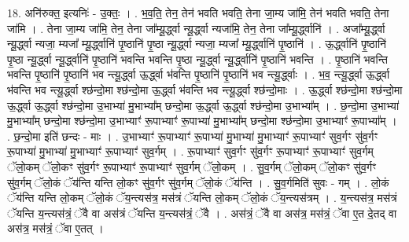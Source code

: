 \documentclass[17pt]{extarticle}
\begin{document}
18. अनि॑रुक्त॒ इत्यनिः॑ - उ॒क्तः॒ । . भ॒व॒ति॒ तेन॒ तेन॑ भवति भवति॒ तेना जा॒म्य जा॑मि॒ तेन॑ भवति भवति॒ तेना जा॑मि । . तेना जा॒म्य जा॑मि॒ तेन॒ तेना जा᳚म्यू॒र्द्ध्वा न्यू॒र्द्ध्वा न्यजा॑मि॒ तेन॒ तेना जा᳚म्यू॒र्द्ध्वानि॑ । . अजा᳚म्यू॒र्द्ध्वा न्यू॒र्द्ध्वा न्यजा॒ म्यजा᳚ म्यू॒र्द्ध्वानि॑ पृ॒ष्ठानि॑ पृ॒ष्ठा न्यू॒र्द्ध्वा न्यजा॒ म्यजा᳚ म्यू॒र्द्ध्वानि॑ पृ॒ष्ठानि॑ । . ऊ॒र्द्ध्वानि॑ पृ॒ष्ठानि॑ पृ॒ष्ठा न्यू॒र्द्ध्वा न्यू॒र्द्ध्वानि॑ पृ॒ष्ठानि॑ भवन्ति भवन्ति पृ॒ष्ठा न्यू॒र्द्ध्वा न्यू॒र्द्ध्वानि॑ पृ॒ष्ठानि॑ भवन्ति । . पृ॒ष्ठानि॑ भवन्ति भवन्ति पृ॒ष्ठानि॑ पृ॒ष्ठानि॑ भव न्त्यू॒र्द्ध्वा ऊ॒र्द्ध्वा भ॑वन्ति पृ॒ष्ठानि॑ पृ॒ष्ठानि॑ भव न्त्यू॒र्द्ध्वाः । . भ॒व॒ न्त्यू॒र्द्ध्वा ऊ॒र्द्ध्वा भ॑वन्ति भव न्त्यू॒र्द्ध्वा श्छ॑न्दो॒मा श्छ॑न्दो॒मा ऊ॒र्द्ध्वा भ॑वन्ति भव न्त्यू॒र्द्ध्वा श्छ॑न्दो॒माः । . ऊ॒र्द्ध्वा श्छ॑न्दो॒मा श्छ॑न्दो॒मा ऊ॒र्द्ध्वा ऊ॒र्द्ध्वा श्छ॑न्दो॒मा उ॒भाभ्या॑ मु॒भाभ्या᳚म् छन्दो॒मा ऊ॒र्द्ध्वा ऊ॒र्द्ध्वा श्छ॑न्दो॒मा उ॒भाभ्या᳚म् । . छ॒न्दो॒मा उ॒भाभ्या॑ मु॒भाभ्या᳚म् छन्दो॒मा श्छ॑न्दो॒मा उ॒भाभ्याꣳ॑ रू॒पाभ्याꣳ॑ रू॒पाभ्या॑ मु॒भाभ्या᳚म् छन्दो॒मा श्छ॑न्दो॒मा उ॒भाभ्याꣳ॑ रू॒पाभ्या᳚म् । . छ॒न्दो॒मा इति॑ छन्दः - माः । . उ॒भाभ्याꣳ॑ रू॒पाभ्याꣳ॑ रू॒पाभ्या॑ मु॒भाभ्या॑ मु॒भाभ्याꣳ॑ रू॒पाभ्याꣳ॑ सुव॒र्गꣳ सु॑व॒र्गꣳ रू॒पाभ्या॑ मु॒भाभ्या॑ मु॒भाभ्याꣳ॑ रू॒पाभ्याꣳ॑ सुव॒र्गम् । . रू॒पाभ्याꣳ॑ सुव॒र्गꣳ सु॑व॒र्गꣳ रू॒पाभ्याꣳ॑ रू॒पाभ्याꣳ॑ सुव॒र्गम् ॅलो॒कम् ॅलो॒कꣳ सु॑व॒र्गꣳ रू॒पाभ्याꣳ॑ रू॒पाभ्याꣳ॑ सुव॒र्गम् ॅलो॒कम् । . सु॒व॒र्गम् ॅलो॒कम् ॅलो॒कꣳ सु॑व॒र्गꣳ सु॑व॒र्गम् ॅलो॒कं ॅय॑न्ति यन्ति लो॒कꣳ सु॑व॒र्गꣳ सु॑व॒र्गम् ॅलो॒कं ॅय॑न्ति । . सु॒व॒र्गमिति॑ सुवः - गम् । . लो॒कं ॅय॑न्ति यन्ति लो॒कम् ॅलो॒कं ॅय॒न्त्यस॑त्र॒ मस॑त्रं ॅयन्ति लो॒कम् ॅलो॒कं ॅय॒न्त्यस॑त्रम् । . य॒न्त्यस॑त्र॒ मस॑त्रं ॅयन्ति य॒न्त्यस॑त्रं॒ ॅवै वा अस॑त्रं ॅयन्ति य॒न्त्यस॑त्रं॒ ॅवै । . अस॑त्रं॒ ॅवै वा अस॑त्र॒ मस॑त्रं॒ ॅवा ए॒त दे॒तद् वा अस॑त्र॒ मस॑त्रं॒ ॅवा ए॒तत् । \newline
\end{document}
